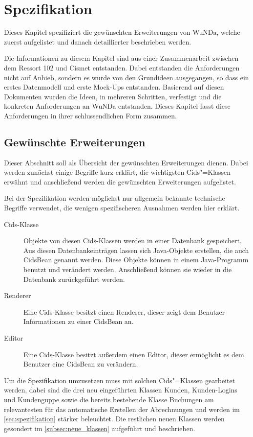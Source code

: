 \chapter{Spezifikation} \label{ch:spezi}
Dieses Kapitel spezifiziert die gewünschten Erweiterungen von \ac{WuNDa}, welche zuerst aufgelistet und danach detaillierter beschrieben werden.

Die Informationen zu diesem Kapitel sind aus einer Zusammenarbeit zwischen dem Ressort 102 und Cismet entstanden.
Dabei entstanden die Anforderungen nicht auf Anhieb, sondern es wurde von den Grundideen ausgegangen, so dass ein erstes Datenmodell und erste Mock-Ups entstanden.
Basierend auf diesen Dokumenten wurden die Ideen, in mehreren Schritten, verfestigt und die konkreten Anforderungen an \ac{WuNDa} entstanden.
Dieses Kapitel fasst diese Anforderungen in ihrer schlussendlichen Form zusammen. 

\section{Gewünschte Erweiterungen} \label{sec:gewuenschte-erweiterungen}
Dieser Abschnitt soll als Übersicht der gewünschten Erweiterungen dienen.
Dabei werden zunächst einige Begriffe kurz erklärt, die wichtigsten Cids"=Klassen erwähnt und anschließend werden die gewünschten Erweiterungen aufgelistet.

Bei der Spezifikation werden möglichst nur allgemein bekannte technische Begriffe verwendet, die wenigen spezifischeren Ausnahmen werden hier erklärt.
\begin{description}
\item[Cids-Klasse] Objekte von diesen Cids-Klassen werden in einer Datenbank gespeichert.
Aus diesen Datenbankeinträgen lassen sich Java-Objekte erstellen, die auch CidsBean genannt werden.
Diese Objekte können in einem Java-Programm benutzt und verändert werden.
Anschließend können sie wieder in die Datenbank zurückgeführt werden.
\item[Renderer] Eine Cids-Klasse besitzt einen Renderer, dieser zeigt dem Benutzer Informationen zu einer CidsBean an.
\item[Editor] Eine Cids-Klasse besitzt außerdem einen Editor, dieser ermöglicht es dem Benutzer eine CidsBean zu verändern.
\end{description}

Um die Spezifikation umzusetzen muss mit solchen Cids"=Klassen gearbeitet werden, dabei sind die drei neu eingeführten Klassen Kunden, Kunden-Logins und Kundenguppe sowie die bereits bestehende Klasse Buchungen am relevantesten für das automatische Erstellen der Abrechnungen und werden im \autoref{sec:spezifikation} stärker beleuchtet. 
Die restlichen neuen Klassen werden gesondert im \autoref{subsec:neue_klassen} aufgeführt und beschrieben.

